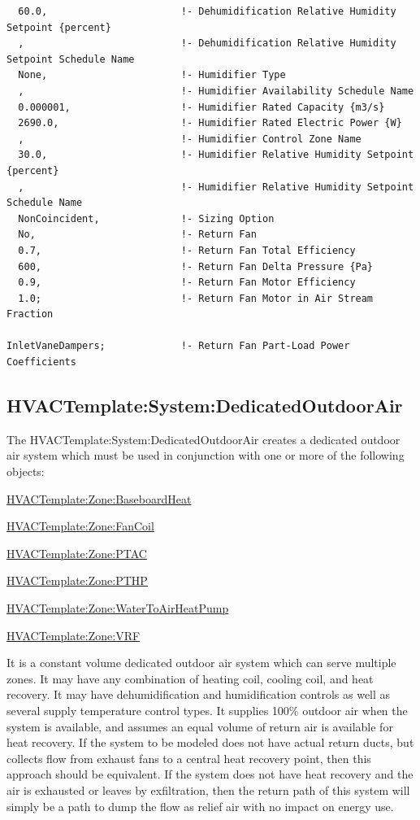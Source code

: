 \begin{lstlisting}
  60.0,                       !- Dehumidification Relative Humidity Setpoint {percent}
  ,                           !- Dehumidification Relative Humidity Setpoint Schedule Name
  None,                       !- Humidifier Type
  ,                           !- Humidifier Availability Schedule Name
  0.000001,                   !- Humidifier Rated Capacity {m3/s}
  2690.0,                     !- Humidifier Rated Electric Power {W}
  ,                           !- Humidifier Control Zone Name
  30.0,                       !- Humidifier Relative Humidity Setpoint {percent}
  ,                           !- Humidifier Relative Humidity Setpoint Schedule Name
  NonCoincident,              !- Sizing Option
  No,                         !- Return Fan
  0.7,                        !- Return Fan Total Efficiency
  600,                        !- Return Fan Delta Pressure {Pa}
  0.9,                        !- Return Fan Motor Efficiency
  1.0;                        !- Return Fan Motor in Air Stream Fraction

InletVaneDampers;             !- Return Fan Part-Load Power Coefficients
\end{lstlisting}

\subsection{HVACTemplate:System:DedicatedOutdoorAir}\label{hvactemplatesystemdedicatedoutdoorair}

The HVACTemplate:System:DedicatedOutdoorAir creates a dedicated outdoor air system which must be used in conjunction with one or more of the following objects:

\hyperref[hvactemplatezonebaseboardheat]{HVACTemplate:Zone:BaseboardHeat}

\hyperref[hvactemplatezonefancoil]{HVACTemplate:Zone:FanCoil}

\hyperref[hvactemplatezoneptac]{HVACTemplate:Zone:PTAC}

\hyperref[hvactemplatezonepthp]{HVACTemplate:Zone:PTHP}

\hyperref[hvactemplatezonewatertoairheatpump]{HVACTemplate:Zone:WaterToAirHeatPump}

\hyperref[hvactemplatezonevrf]{HVACTemplate:Zone:VRF}

It is a constant volume dedicated outdoor air system which can serve multiple zones. It may have any combination of heating coil, cooling coil, and heat recovery. It may have dehumidification and humidification controls as well as several supply temperature control types. It supplies 100\% outdoor air when the system is available, and assumes an equal volume of return air is available for heat recovery. If the system to be modeled does not have actual return ducts, but collects flow from exhaust fans to a central heat recovery point, then this approach should be equivalent. If the system does not have heat recovery and the air is exhausted or leaves by exfiltration, then the return path of this system will simply be a path to dump the flow as relief air with no impact on energy use.

